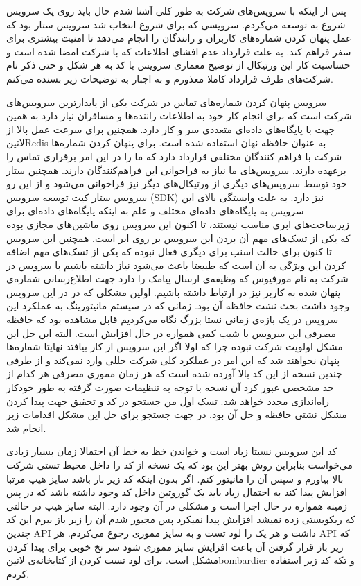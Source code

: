 \documentclass[a4]{report}
\begin{document}

پس از اینکه با سرویس‌های شرکت به طور کلی آشنا شدم حال باید روی یک سرویس شروع به توسعه می‌کردم.
سرویسی که برای شروع انتخاب شد سرویس ستار بود که عمل پنهان کردن شماره‌های کاربران و رانندگان را انجام می‌دهد تا امنیت بیشتری برای سفر فراهم کند.
به علت قرارداد عدم افشای اطلاعات که با شرکت امضا شده است و حساسیت کار این ورتیکال از توضیح معماری سرویس یا کد به هر شکل و حتی ذکر نام شرکت‌های
طرف قرارداد کاملا معذورم و به اجبار به توضیحات زیر بسنده می‌کنم.

سرویس پنهان کردن شماره‌های تماس در شرکت یکی از پایدارترین سرویس‌های شرکت است
که برای انجام کار خود به اطلاعات راننده‌ها و مسافران نیاز دارد
به همین جهت با پایگاه‌های داده‌ای متعددی سر و کار دارد.
همچنین برای سرعت عمل بالا از ‌لاتین{Redis} به عنوان حافظه نهان استفاده شده است.
برای پنهان کردن شماره‌ها شرکت با فراهم کنندگان مختلفی قرارداد دارد که ما را در این امر برقراری تماس را برعهده دارند.
سرویس‌های ما نیاز به فراخوانی این فراهم‌کنندگان دارند.
همچنین ستار خود توسط سرویس‌های دیگری از ورتیکال‌های دیگر نیز فراخوانی می‌شود و از این رو سرویس ستار
کیت توسعه سرویس (SDK) نیز دارد.
به علت وابستگی بالای این سرویس به پایگاه‌های داده‌ای مختلف و علم به اینکه پایگاه‌های داده‌ای
برای زیرساخت‌های ابری مناسب نیستند، تا اکنون این سرویس روی ماشین‌های مجازی بوده که یکی از تسک‌های مهم آن بردن این سرویس بر روی ابر است.
همچنین این سرویس تا کنون برای حالت اسنپ برای دیگری فعال نبوده که یکی از تسک‌های مهم اضافه کردن این ویژگی به آن است که طبیعتا باعث
می‌شود نیاز داشته باشیم با سرویس در شرکت به نام مورفیوس که وظیفه‌ی ارسال پیامک را دارد جهت اطلاع‌رسانی شماره‌ی پنهان شده به کاربر نیز در ارتباط داشته باشیم.
اولین مشکلی که در در این سرویس وجود داشت بحث نشت حافظه آن بود.
زمانی که در سیستم مانیتورینگ به عملکرد این سرویس در یک بازه‌ی زمانی نستا بزرگ نگاه می‌کردیم قابل مشاهده بود که حافظه مصرفی این سرویس با شیب کمی همواره در حال
افزایش است.
البته این حل این مشکل اولویت شرکت نبوده چرا که اولا اگر این سرویس از کار بیافتد نهایتا شماره‌ها پنهان نخواهند شد
که این امر در عملکرد کلی شرکت خللی وارد نمی‌کند و از طرفی چندین نسخه از این کد بالا آورده شده است که هر زمان مموری مصرفی هر کدام از حد مشخصی عبور کرد
آن نسخه با توجه به تنظیمات صورت گرفته به طور خودکار راه‌اندازی مجدد خواهد شد.
تسک اول من جستجو در کد و تحقیق جهت پیدا کردن مشکل نشتی حافظه و حل آن بود.
در جهت جستجو برای حل این مشکل اقدامات زیر انجام شد.

کد این سرویس نسبتا زیاد است و خواندن خظ به خط آن احتمالا زمان بسیار زیادی می‌خواست بنابراین روش بهتر این بود که یک نسخه از کد را داخل محیط تستی شرکت بالا بیاورم و
سپس آن را مانیتور کنم. اگر بدون اینکه کد زیر بار باشد سایز هیپ مرتبا افزایش پیدا کند به احتمال زیاد باید یک گوروتین داخل کد وجود داشته باشد
که در پس زمینه همواره در حال اجرا است و مشکلی در آن وجود دارد.
البته سایز هیپ در حالتی که ریکويستی زده نمیشد افزایش پیدا نمیکرد پس مجبور شدم آن را زیر باز ببرم این کد چندین API داشت و هر یک را لود تست و به سایز مموری رجوع می‌کردم.
هر API که زیر باز قرار گرفتن آن باعث افزایش سایز مموری شود سر نخ خوبی برای پیدا کردن مشکل است.
برای لود تست کردن از کتابخانه‌ی ‌لاتین{bombardier} و تکه کد زیر استفاده کردم.
\end{document}
